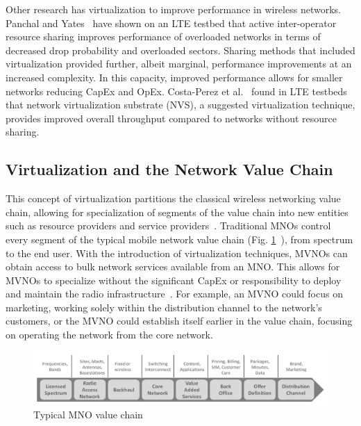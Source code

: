 \documentclass[12pt,dvipsnames]{report}
\begin{document}
Other research has virtualization to improve performance in wireless networks.  Panchal and Yates~\cite{6571315} have shown on an LTE testbed that active inter-operator resource sharing improves performance of overloaded networks in terms of decreased drop probability and overloaded sectors.  Sharing methods that included virtualization provided further, albeit marginal, performance improvements at an increased complexity.  In this capacity, improved performance allows for smaller networks reducing CapEx and OpEx.  Costa-Perez et al.~\cite{6553675} found in LTE testbeds that network virtualization substrate (NVS), a suggested virtualization technique, provides improved overall throughput compared to networks without resource sharing.

\subsection{Virtualization and the Network Value Chain} \label{subsec:virtualization_valuechain}

This concept of virtualization partitions the classical wireless networking value chain, allowing for specialization of segments of the value chain into new entities such as resource providers and service providers~\cite{1421931}.  Traditional MNOs control every segment of the typical mobile network value chain (Fig. \ref{fig:ClassicNetworkValueChain}~\cite{6737248}), from spectrum to the end user.  With the introduction of virtualization techniques, MVNOs can obtain access to bulk network services available from an MNO.  This allows for MVNOs to specialize without the significant CapEx or responsibility to deploy and maintain the radio infrastructure~\cite{6737248}.  For example, an MVNO could focus on marketing, working solely within the distribution channel to the network's customers, or the MVNO could establish itself earlier in the value chain, focusing on operating the network from the core network.

\begin{figure}
	\centering
	\includegraphics[width=\linewidth]{ClassicNetworkValueChain}
	\caption[Typical MNO value chain]{\small Typical MNO value chain~\cite{6737248}}
	\label{fig:ClassicNetworkValueChain}
\end{figure}
\end{document}

